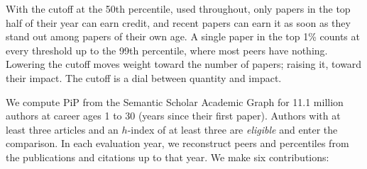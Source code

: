\documentclass[11pt]{article}
\begin{document}
With the cutoff at the 50th percentile, used throughout, only papers in the top half of their year can earn credit, and
recent papers can earn it as soon as they stand out among papers of their own age. A single paper in the top 1\% counts
at every threshold up to the 99th percentile, where most peers have nothing. Lowering the cutoff moves weight toward the
number of papers; raising it, toward their impact. The cutoff is a dial between quantity and impact.

We compute PiP from the Semantic Scholar Academic Graph \citep{kinney2023semantic} for 11.1 million authors at career
ages 1 to 30 (years since their first paper). Authors with at least three articles and an $h$-index of at least three
are \emph{eligible} and enter the comparison. In each evaluation year, we reconstruct peers and percentiles from the
publications and citations up to that year. We make six contributions:
\end{document}
